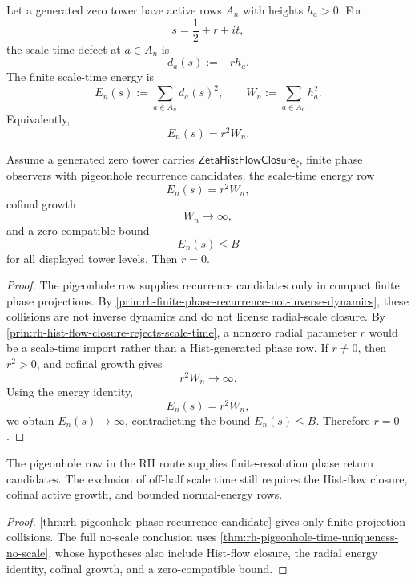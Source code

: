 \begin{definition}
\label{def:rh-scale-time-energy-zero-tower}
Let a generated zero tower have active rows $A_n$ with heights
$h_a>0$. For
$$
s=\frac12+r+it,
$$
the scale-time defect at $a\in A_n$ is
$$
d_a(s):=-r h_a.
$$
The finite scale-time energy is
$$
E_n(s):=\sum_{a\in A_n}d_a(s)^2,
\qquad
W_n:=\sum_{a\in A_n}h_a^2.
$$
Equivalently,
$$
E_n(s)=r^2W_n.
$$
\end{definition}

\begin{theorem}
\label{thm:rh-pigeonhole-time-uniqueness-no-scale}
Assume a generated zero tower carries
$\mathsf{ZetaHistFlowClosure}_{\zeta}$, finite phase observers with
pigeonhole recurrence candidates, the scale-time energy row
$$
E_n(s)=r^2W_n,
$$
cofinal growth
$$
W_n\to\infty,
$$
and a zero-compatible bound
$$
E_n(s)\le B
$$
for all displayed tower levels. Then $r=0$.
\end{theorem}

\begin{proof}
The pigeonhole row supplies recurrence candidates only in compact finite
phase projections.  By
\autoref{prin:rh-finite-phase-recurrence-not-inverse-dynamics}, these
collisions are not inverse dynamics and do not license radial-scale
closure.  By
\autoref{prin:rh-hist-flow-closure-rejects-scale-time}, a nonzero
radial parameter $r$ would be a scale-time import rather than a
Hist-generated phase row. If $r\ne0$, then $r^2>0$, and cofinal growth
gives
$$
r^2W_n\to\infty.
$$
Using the energy identity,
$$
E_n(s)=r^2W_n,
$$
we obtain $E_n(s)\to\infty$, contradicting the bound $E_n(s)\le B$.
Therefore $r=0$.
\end{proof}

\begin{corollary}
\label{cor:rh-pigeonhole-row-phase-candidate}
The pigeonhole row in the RH route supplies finite-resolution phase
return candidates. The exclusion of off-half scale time still requires
the Hist-flow closure, cofinal active growth, and bounded normal-energy
rows.
\end{corollary}

\begin{proof}
\autoref{thm:rh-pigeonhole-phase-recurrence-candidate} gives only
finite projection collisions. The full no-scale conclusion uses
\autoref{thm:rh-pigeonhole-time-uniqueness-no-scale}, whose hypotheses
also include Hist-flow closure, the radial energy identity, cofinal
growth, and a zero-compatible bound.
\end{proof}

